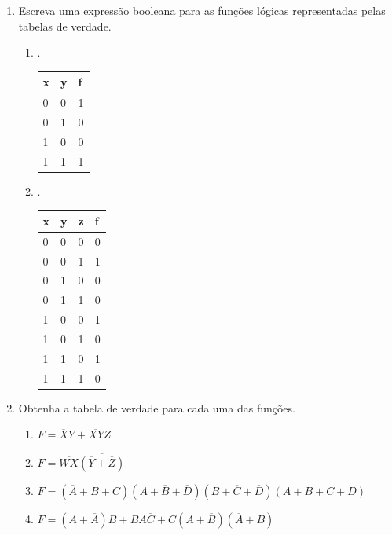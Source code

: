 \documentclass[12pt,onepage,a4paper]{memoir}
\begin{document}
\begin{enumerate}
    
    \item Escreva uma expressão booleana para as funções lógicas representadas pelas tabelas de verdade.
    
    \begin{enumerate}
        \item  .
                \begin{table}[H]
                    \begin{tabular}{|l|l|l|}
                    \hline
                        x & y & f \\ \hline
                        0 & 0 & 1 \\ \hline
                        0 & 1 & 0 \\ \hline
                        1 & 0 & 0 \\ \hline
                        1 & 1 & 1 \\ \hline
                    \end{tabular}
                \end{table}

        \item .
                \begin{table}[H]
\begin{tabular}{|l|l|l|l|}
\hline
x & y & z & f \\ \hline
0 & 0 & 0 & 0 \\ \hline
0 & 0 & 1 & 1 \\ \hline
0 & 1 & 0 & 0 \\ \hline
0 & 1 & 1 & 0 \\ \hline
1 & 0 & 0 & 1 \\ \hline
1 & 0 & 1 & 0 \\ \hline
1 & 1 & 0 & 1 \\ \hline
1 & 1 & 1 & 0 \\ \hline
\end{tabular}
\end{table}
    \end{enumerate}
       
    \item Obtenha a tabela de verdade para cada uma das funções.
    \begin{enumerate}
        \item $F = \overline{X}Y + \overline{XY}Z$
        \item $F = \overline{WX}\overline{(\overline{Y} + \overline{Z})}$
        \item $F = (\overline{A} + B + C)(A + \overline{B} + \overline{D})(B + \overline{C} + \overline{D})(A + B + C + D)$
        \item $F = (A + \overline{A})B + BA\overline{C} + C(A + \overline{B})(\overline{A} + B)$
    \end{enumerate}


\end{enumerate}
\end{document}
